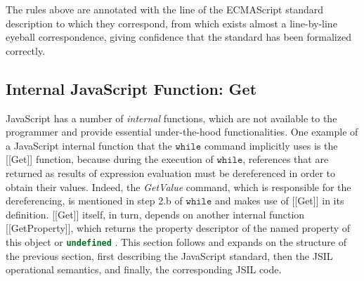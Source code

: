 \documentclass[a4paper,11pt,twoside]{report}
\def\jsinline{\lstinline[language=JavaScript, basicstyle=\small]}%\end{lstlisting}
\begin{document}

\noindent The rules above are annotated with the line of the ECMAScript standard description to which they correspond, from which exists almost a line-by-line eyeball correspondence, giving confidence that the standard has been formalized correctly. 

\subsection{Internal JavaScript Function: Get}\label{sec:get}
JavaScript has a number of {\em internal} functions, which are not available to the programmer and provide essential under-the-hood functionalities. One example of a JavaScript internal function that the $\mathtt{while}$ command implicitly uses is the [[Get]] function, because during the execution of $\mathtt{while}$, references that are returned as results of expression evaluation must be dereferenced in order to obtain their values. Indeed, the \textit{GetValue} command, which is responsible for the dereferencing, is mentioned in step 2.b of $\mathtt{while}$ and makes use of [[Get]] in its definition. [[Get]] itself, in turn, depends on another internal function [[GetProperty]], which returns the property descriptor of the named property of this object or \jsinline|undefined| \cite{EcmaScript}. This section follows and expands on the structure of the previous section, first describing the JavaScript standard, then the JSIL operational semantics, and finally, the corresponding JSIL code.
\end{document}

